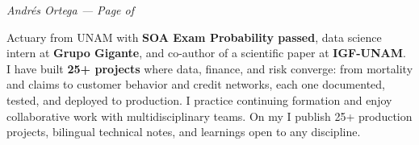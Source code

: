 \documentclass[10pt, letterpaper]{awesome-cv}
\renewcommand{\acvSectionContentTopSkip}{0.3mm}
\renewenvironment{cvparagraph}{%
  \vspace{\acvSectionContentTopSkip}%
  \vspace{-3mm}%
  \paragraphstyle%
}{%
  \par%
  \vspace{0.3mm}%
}
\renewcommand*{\paragraphstyle}{\fontsize{8.5pt}{1.15em}\bodyfontlight\upshape\color{text}}
\begin{document}
\makecvheader[C]


\makecvfooter
  {}
  {\color{lightgray}\textit{\small Andrés Ortega — Page \thepage{} of \pageref*{LastPage}}}
  {}


\begin{cvparagraph}
Actuary from UNAM with \textbf{SOA Exam Probability passed}, data science intern at \textbf{Grupo Gigante}, and co-author of a scientific paper at \textbf{IGF-UNAM}. I have built \textbf{25+ projects} where data, finance, and risk converge: from mortality and claims to customer behavior and credit networks, each one documented, tested, and deployed to production. I practice continuing formation and enjoy collaborative work with multidisciplinary teams. On my  I publish 25+ production projects, bilingual technical notes, and learnings open to any discipline.
\end{cvparagraph}

\end{document}
